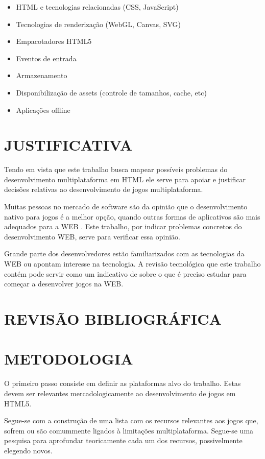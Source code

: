 \documentclass[
12pt,
a4paper,
portuges,
draft
]{report}
\begin{document}
\begin{itemize}
\item HTML e tecnologias relacionadas (CSS, JavaScript)
\item Tecnologias de renderização (WebGL, Canvas, SVG)
\item Empacotadores HTML5
\item Eventos de entrada
\item Armazenamento
\item Disponibilização de assets (controle de tamanhos, cache, etc)
\item Aplicações offline
\end{itemize}

\chapter{JUSTIFICATIVA}

Tendo em vista que este trabalho busca mapear possíveis problemas
do desenvolvimento multiplataforma em HTML ele serve para apoiar
e justificar decisões relativas ao desenvolvimento de jogos
multiplataforma.

Muitas pessoas no mercado de software são da opinião que o
desenvolvimento nativo para jogos é a melhor opção, quando outras formas de aplicativos são mais adequados para a WEB \cite[pp. 21]{aSeriousContender}. Este trabalho, por indicar problemas concretos do desenvolvimento
WEB, serve para verificar essa opinião.

Grande parte dos desenvolvedores estão familiarizados com as
tecnologias da WEB ou apontam interesse na tecnologia. A revisão
tecnológica que este trabalho contém pode servir como um indicativo
de sobre o que é preciso estudar para começar a desenvolver jogos na
WEB.


\chapter{REVISÃO BIBLIOGRÁFICA}

\chapter{METODOLOGIA}
\thispagestyle{myheadings}

O primeiro passo consiste em definir as plataformas alvo do trabalho.
Estas devem ser relevantes mercadologicamente ao desenvolvimento de
jogos em HTML5.

Segue-se com a construção de uma lista com os recursos relevantes
aos jogos que, sofrem ou são comummente ligados à
limitações multiplataforma. Segue-se uma pesquisa para aprofundar
teoricamente cada um dos recursos, possivelmente elegendo novos.
\end{document}
